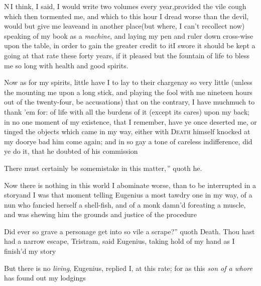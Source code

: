 \documentclass{article}
\begin{document}
\lettrine{N}{\,}\tsh I think, I said, I
would write two volumes every year,\break provided the vile cough which
then tormented me, and which to this hour I dread worse than the
devil, would but give me leave\tsk and in another
place\tsk (but where, I can’t recollect now) speaking of my
book as a \textit{machine}, and laying my pen and ruler down
cross-wise upon the table, in order to gain the greater credit to
it\tsk I swore it should be kept a going at that rate these forty
years, if it pleased but the fountain of life to bless me so long
with health and good spirits.

Now as for my spirits, little have I to lay to their
charge\tsk nay so very little (unless the mounting me upon a long
stick, and playing the fool with me nineteen hours out of the
twenty-four, be accusations) that on the contrary, I have
much\tsk much to thank ’em for:\break 
{}
of life with all the burdens of it (except its
cares) upon my back; in no one moment of my existence, that I
remember, have ye once deserted me, or tinged the objects which
came in my way, either with
\textsc{Death} himself knocked at my door\tsk ye bad him
come again; and in so gay a tone of careless indifference, did ye
do it, that he doubted of his commission\tsh

\indent\lqq\tsh There must certainly be some\break\lqq mistake in this
matter,\,” quoth he.

Now there is nothing in this world I abominate worse, than to be
interrupted in a story\tsh and I was that moment telling
Eugenius a most tawdry one in my way, of a nun who fancied
herself a shell-fish, and of a monk damn’d for\break eating a
muscle, and was shewing him the grounds and justice of the
procedure\tsh{}

\noindent\lqq\tsk Did ever so grave a personage\break
\lqq get into so vile a scrape?” quoth\break
Death. Thou hast had a narrow escape,
Tristram, said Eugenius, taking hold of my hand as I
finish’d my story\tsh

But there is no \textit{living}, Eugenius, replied I, at this
rate; for as this \textit{son of a whore} has found out my
lodgings\tsh
\end{document}
